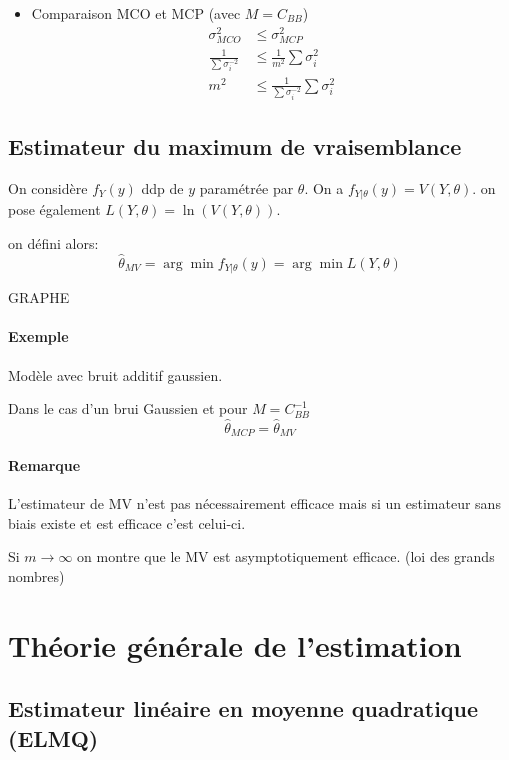 \documentclass[main.tex]{subfiles}
\begin{document}
\begin{itemize}
\begin{itemize}
\end{itemize}
\item Comparaison MCO et MCP (avec $M = C_{BB}$)
  \begin{align*}
    \sigma_{MCO}^2 &\leq \sigma_{MCP}^2\\
    \frac{1}{\sum\sigma_i^{-2}} & \leq \frac{1}{m^2}\sum\sigma_i^2\\
    m ^2 &\leq \frac{1}{\sum\sigma_i^{-2}} \sum\sigma_i^2
  \end{align*}

\end{itemize}

\subsection{Estimateur du maximum de vraisemblance}
\begin{defin}
On considère $f_{Y}(y)$ ddp de $y$ paramétrée par $\theta$. On a $f_{Y|\theta}(y) = V(Y,\theta)$. on pose également $L(Y,\theta) = \ln(V(Y,\theta))$.

on défini alors:
\[
\hat{\theta}_{MV} = \arg\min f_{Y|\theta}(y) = \arg\min L(Y,\theta)
\]
\end{defin}

GRAPHE

\paragraph{Exemple} Modèle avec bruit additif gaussien.


\begin{prop}
  Dans le cas d'un brui Gaussien et pour $M = C_{BB}^{-1}$
  \[
    \hat{\theta}_{MCP}=\hat{\theta}_{MV}
  \]

\end{prop}

\paragraph{Remarque}
L'estimateur de MV n'est pas nécessairement efficace mais si un estimateur sans biais existe et est efficace c'est celui-ci.

Si $m \to\infty $ on montre que le MV est asymptotiquement efficace. (loi des grands nombres)
\section{Théorie générale de l'estimation}
\subsection{Estimateur linéaire en moyenne quadratique (ELMQ)}
\end{document}
